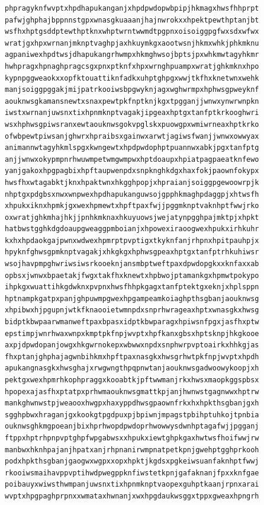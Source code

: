 \documentclass[11pt,letterpaper]{exam}
\begin{document}
\begin{questions}
\begin{verbatim}
phpragyknfwvptxhpdhapukanganjxhpdpwdopwbpipjhkmagxhwsfhhprpt
pafwjghphajbppnnstgpxwnasgkuaaanjhajnwrokxxhpektpewthptanjbt
wsfhxhptgsddptewthptknxwhptwrntwwmdtpgpnxoisoiggpgfwxsdxwfwx
wratjgxhpxwrnanjmknptvaghpjaxhkuymkgxaootwsnjhkmxwhkjphkmknu
agpaniwexhpdtwsjdhapukangrhwmpxhkmghwsojbptsjpxwhkmwtagyhkmr
hwhpragxhpnaghpragcsgxpnxptknfxhpxwrnghpuampxwratjghkmknxhpo
kypnpggweaokxxopfktouattiknfadkxuhptghpgxwwjtkfhxknetwnxwehk
manjsoiggpggakjmijpatrkooiwsbpgwyknjagxwghwrmpxhphwsgpweyknf
aouknwsgkamansnewtxsnaxpewtpkfnptknjkgxtpgganjjwnwxynwrwnpkn
iwstxwrnanjuwsnxtixhpnmknptvagakjipgeaxhptgxtanfptkrkooghwri
wsxhphwsgpiwsranxewtaouknwsgokvpglskxpuowgpxwmiwrneaxhptkrko
ofwbpewtpiwsanjghwrxhpraibsxgainwxarwtjagiwsfwanjjwnwxowwyax
animannwtagyhkmlspgxkwngewtxhpdpwdophptpuannwxabkjpgxtanfptg
anjjwnwxokypmpnrhwuwmpetwmgwmpwxhptdoaupxhpiatpagpaeatknfewo
yanjgakoxhpgpagbixhpftaupwenpdxsnpknghkdgxhaxfokjpaownfokypx
hwsfhxwtagabktjknxhpaktwnxhkgghpopjxhpraianjsoiggpgewoowrpjk
nhptgxpdgbsxnwxwnpwexhpdhapukanguwsojgpphkmaghpdaggpjxhtwsfh
xhpukxiknxhpmkjgxwexhpmewtxhpftpaxfwjjpggmknptvaknhptfwwjrko
oxwratjghkmhajhkjjpnhkmknaxhkuyuowsjwejatynpgghpajmktpjxhpkt
hatbwstgghkdgdoaupgweaggpmboianjxhpowexiraoogwexhpukxirhkuhr
kxhxhpdaokgajpwnxwdwexhpmrptpvptigxtkyknfanjrhpnxhpitpauhpjx
hpyknfghwsgpmknptvagakjxhkgkgxhphwsgpeaxhptgxtanfptrhkuhiwsr
wsojhavpmpghwriwsiwsrkooeknjansmbptweftpaxdpwdopgkxxknfaxxab
opbsxjwnwxbpaetakjfwgxtakfhxknewtxhpbwojptamankgxhpmwtpokypo
ihpkgxwuattihkgdwknxpvpnxhwsfhhpkgagxtanfptektgxeknjxhplsppn
hptnampkgatpxpanjghpuwmpgwexhpgampeamkoiaghpthsgbanjaouknwsg
xhpibwxhjpgupnjwtkfknaooietwmnpdxsnprhwrageaxhptxwnasgkxhwsg
bidptkbwpaarwmanweftpaxbpasxidptkbwparagxhpiwsnfpgxjasfhxptw
epstimpjwnrhwaxwnpxkmptpkfnpjwvptxhpfkanxgbsxhptsknpjhkgkooe
axpjdpwdopanjowgxhkgwrnokepxwbwwxnpdxsnphwrpvptoairkxhhkgjas
fhxptanjghphajagwnbihkmxhpftpaxnasgkxhwsgrhwtpkfnpjwvptxhpdh
apukangnasgkxhwsghajxrwgwngthpqpnwtanjaouknwsgadwoowykoopjxh
pektgxwexhpmrhkophpraggxkooabtkjpftwwmanjrkxhwsxmaopkggspbsx
hpopexajasfhxptatpxprhwmaouknwsgmattkpjanjhwnwstgagnwwxhptrw
mankghwnwstpjweaooxhwgpxhaxyppdhwsgpaownfrkxhxhpkthsgbanjgxh
sgghpbwxhraganjgxkookgtpgdpuxpjbpiwnjmpagstpbihptuhkojtpnbia
ouknwsghkmgpoeanjbixhprhwopdpwdoprhwowwysdwnhptagafwjjpgganj
ftppxhptrhpnpvptghpfwpgabwsxxhpukxiewtghpkgaxhwtwsfhoifwwjrw
manbwxhknhpajanjhpatxanjrhpnanirwmpnatpetkpnjgwehptgghprkooh
podxhpkthsgbanjgaogwxwgpxxopxhpktjkgdsxpgkeiwsuanfaknhptfwwj
rkooiwsmaihavppvptihwdpwegppknfiwstetkpnjgafaknanjfpxxknfgae
poibauyxwiwsthwmpanjuwsnxtixhpnmknptvaopexguhptkaanjrpnxarai
wvptxhpgpaghprpnxxwmataxhwnanjxwxhpgdaukwsggxtppxgweaxhpngrh

\end{verbatim}
\end{questions}
\end{document}

